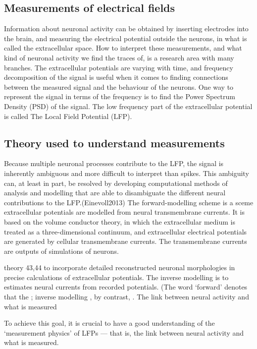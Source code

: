 \documentclass{article}
\begin{document}
\subsection{Measurements of electrical fields}
Information about neuronal activity can be obtained by inserting electrodes into the brain, and measuring the electrical potential outside the neurons, in what is called the extracellular space. How to interpret these measurements, and what kind of neuronal activity we find the traces of, is a research area with many branches. The extracellular potentials are varying with time, and frequency decomposition of the signal is useful when it comes to finding connections between the measured signal and the behaviour of the neurons. One way to represent the signal in terms of the frequency is to find the Power Spectrum Density (PSD) of the signal. The low frequency part of the extracellular potential is called The Local Field Potential (LFP). 

\subsection{Theory used to understand measurements}

Because multiple neuronal processes contribute to the LFP, the signal is inherently ambiguous and more difficult to interpret than spikes. This ambiguity can, at least in part, be resolved by developing computational methods of analysis and modelling that are able to disambiguate the different
neural contributions to the LFP.(Einevoll2013)  The forward-modelling scheme is a sceme extracellular potentials are modelled from neural
transmembrane currents. It is based on the volume conductor theory, in which the extracellular medium is treated as a
three-dimensional continuum, and extracellular electrical potentials are
generated by cellular transmembrane currents. The transmembrane currents are outputs of simulations of neurons.

theory 43,44 to incorporate detailed reconstructed neuronal morphologies in precise
calculations of extracellular potentials. The inverse modelling is to estimates neural currents from recorded potentials. (The word ‘forward’ denotes that
the ; inverse modelling , by contrast,
.
 The link between neural activity and what is measured

To achieve this goal, it is crucial to have a good
understanding of the ‘measurement physics’ of LFPs
— that is, the link between neural activity and what is
measured.
\end{document}
